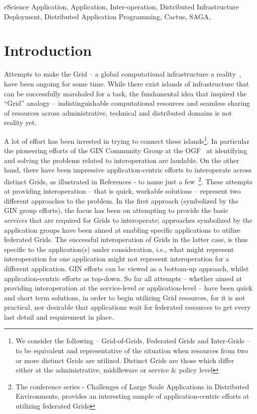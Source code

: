 \documentclass[conference,final]{IEEEtran}
\begin{document}
\begin{keywords}
  eScience Application, Application, Inter-operation, Distributed
  Infrastructure Deployment, Distributed Application Programming,
  Cactus, SAGA,
\end{keywords}

\section{Introduction}%

Attempts to make the Grid -- a global computational infrastructure a
reality~\cite{foxbook}, have been ongoing for some time.  While there
exist islands of infrastructure that can be successfully marshaled for
a task, the fundamental idea that inspired the ``Grid'' analogy --
indistinguishable computational resources and seamless sharing
of resources across administrative, technical and distributed domains
is not reality yet.


A lot of effort has been invested in trying to connect these
islands\footnote{We consider the following -- Grid-of-Grids, Federated
  Grids and Inter-Grids -- to be equivalent and representative of the
  situation when resources from two or more distinct Grids are
  utilized.  Distinct Grids are those which differ either at the
  administrative, middleware or service \& policy level}. In
particular the pioneering efforts of the GIN Community
Group\cite{gin_url} at the OGF~\cite{ogf_url} at identifying and
solving the problems related to interoperation are laudable. On the
other hand, there have been impressive application-centric efforts to
interoperate across distinct Grids, as illustrated in References
\cite{Cactus_GordonBell, clade06} - to name just a few~\footnote{The
  conference series - Challenges of Large Scale Applications in
  Distributed Environments, provides an interesting sample of
  application-centric efforts at utilizing federated Grids}.  These
attempts at providing interoperation -- that is quick, workable
solutions -- represent two different approaches to the problem.  In
the first approach (symbolized by the GIN group efforts), the focus
has been on attempting to provide the basic {\it services} that are
required for Grids to interoperate; approaches symbolized by the
application groups have been aimed at enabling specific applications
to utilize federated Grids.  The successful interoperation of Grids in
the latter case, is thus specific to the application(s) under
consideration, i.e., what might represent interoperation for one
application might not represent interoperation for a different
application.  GIN efforts can be viewed as a bottom-up approach,
whilst application-centric efforts as top-down.  So far all attempts
-- whether aimed at providing interoperation at the service-level or
application-level -- have been quick and short term solutions, in
order to begin utilizing Grid resources, for it is not practical, nor
desirable that applications wait for federated resources to get every
last detail and requirement in place.
\end{document}
